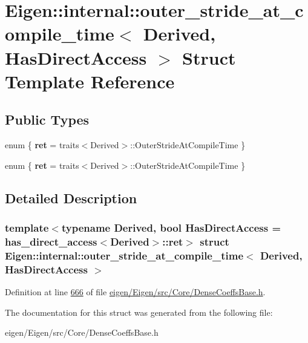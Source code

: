 \hypertarget{struct_eigen_1_1internal_1_1outer__stride__at__compile__time}{}\section{Eigen\+:\+:internal\+:\+:outer\+\_\+stride\+\_\+at\+\_\+compile\+\_\+time$<$ Derived, Has\+Direct\+Access $>$ Struct Template Reference}
\label{struct_eigen_1_1internal_1_1outer__stride__at__compile__time}
\subsection*{Public Types}
\begin{DoxyCompactItemize}
\item 
\mbox{\label{struct_eigen_1_1internal_1_1outer__stride__at__compile__time_aae4f3707a8b43fa84652e60bd3ab60b5}} 
enum \{ {\bfseries ret} = traits$<$Derived$>$\+:\+:Outer\+Stride\+At\+Compile\+Time
 \}
\item 
\mbox{\label{struct_eigen_1_1internal_1_1outer__stride__at__compile__time_af005eb71ea1a23be0e0955288ec77762}} 
enum \{ {\bfseries ret} = traits$<$Derived$>$\+:\+:Outer\+Stride\+At\+Compile\+Time
 \}
\end{DoxyCompactItemize}


\subsection{Detailed Description}
\subsubsection*{template$<$typename Derived, bool Has\+Direct\+Access = has\+\_\+direct\+\_\+access$<$\+Derived$>$\+::ret$>$\newline
struct Eigen\+::internal\+::outer\+\_\+stride\+\_\+at\+\_\+compile\+\_\+time$<$ Derived, Has\+Direct\+Access $>$}



Definition at line \hyperlink{eigen_2_eigen_2src_2_core_2_dense_coeffs_base_8h_source_l00666}{666} of file \hyperlink{eigen_2_eigen_2src_2_core_2_dense_coeffs_base_8h_source}{eigen/\+Eigen/src/\+Core/\+Dense\+Coeffs\+Base.\+h}.



The documentation for this struct was generated from the following file\+:\begin{DoxyCompactItemize}
\item 
eigen/\+Eigen/src/\+Core/\+Dense\+Coeffs\+Base.\+h\end{DoxyCompactItemize}
